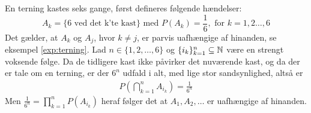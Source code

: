 \begin{exmp}\label{exmp:uafhængelighed}
En terning kastes seks gange, først defineres følgende hændelser: \begin{equation*} 
    A_k=\{6 \text{ ved det k'te kast}\} \text{ med } P(A_k)=\frac{1}{6}, \text{ for } k = 1,2\ldots,6 
\end{equation*} 
Det gælder, at $A_k$ og $A_j$, hvor  $k\neq j$, er parvis uafhængige af hinanden, se eksempel \ref{exp:terning}. Lad $n \in \{1, 2, \ldots, 6\}$ og $\{i_k\}_{k = 1}^n\subseteq \mathbb{N}$ være en strengt voksende følge.
Da de tidligere kast ikke påvirker det nuværende kast, og da der er tale om en terning, er der $6^n$ udfald i alt, med lige stor sandsynlighed, altså er
\begin{align*}
    P\left(\bigcap_{k=1}^n A_{i_k}\right)=\frac{1}{6^n}
\end{align*}
 Men $\frac{1}{6^n} = \prod_{k=1}^n P\left(A_{i_k}\right)$ heraf følger det at $A_1, A_2, \ldots$ er uafhængige af hinanden.
\end{exmp}
